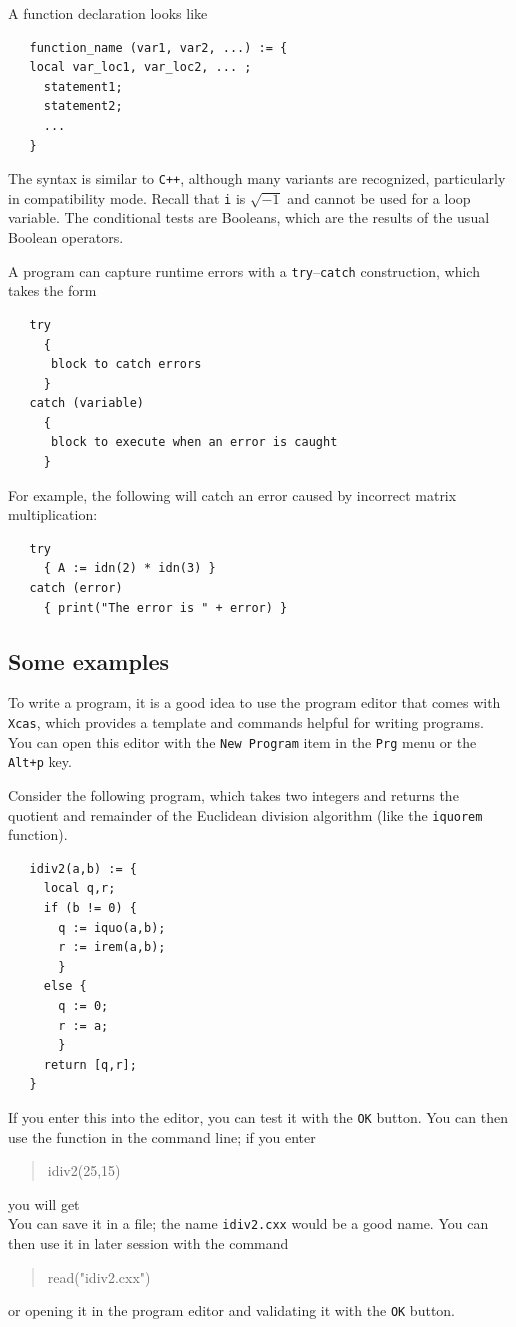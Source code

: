 \documentclass{article}
\newcommand{\xcasin}[1]
{\begin{quote}\ttfamily
#1
\end{quote}}
\newcommand{\xcasout}[1]
{\begin{equation*}
#1
\end{equation*}}
\begin{document}
A function declaration looks like
\begin{verbatim}
   function_name (var1, var2, ...) := {
   local var_loc1, var_loc2, ... ;
     statement1;
     statement2;
     ...
   }
\end{verbatim}
The syntax is similar to \texttt{C++}, although many variants are
recognized, particularly in compatibility mode.
Recall that \texttt{i} is $\sqrt{-1}$ and cannot be used for a loop
variable.  
The conditional tests are Booleans, which are the results of the usual
Boolean operators.

A program can capture runtime errors with a
\texttt{try}--\texttt{catch} construction, which takes the form
\begin{verbatim}
   try 
     {
      block to catch errors
     }
   catch (variable)
     {
      block to execute when an error is caught
     }
\end{verbatim}
For example, the following will catch an error caused by incorrect
matrix multiplication:
\begin{verbatim}
   try 
     { A := idn(2) * idn(3) }
   catch (error)
     { print("The error is " + error) }
\end{verbatim}

\subsection{Some examples}

To write a program, it is a good idea to use the program editor that
comes with \texttt{Xcas}, which provides a template and commands
helpful for writing programs.  You can open this editor with the
\texttt{New Program} item in the \texttt{Prg} menu or the
\texttt{Alt+p} key.

Consider the following program, which takes two integers and returns the
quotient and remainder of the Euclidean division algorithm (like the
\texttt{iquorem} function).
\begin{verbatim}
   idiv2(a,b) := {
     local q,r;
     if (b != 0) {
       q := iquo(a,b);
       r := irem(a,b);
       }
     else {
       q := 0;
       r := a;
       }
     return [q,r];
   }
\end{verbatim}
If you enter this into the editor, you can test it with the
\texttt{OK} button.  You can then use the function in the command
line; if you enter
\xcasin{idiv2(25,15)}
you will get
\xcasout{[1,10]}
You can save it in a file; the name \texttt{idiv2.cxx} would be a good
name.  You can then use it in later session with the command
\xcasin{read("idiv2.cxx")}
or opening it in the program editor and validating it with the
\texttt{OK} button.
\end{document}
